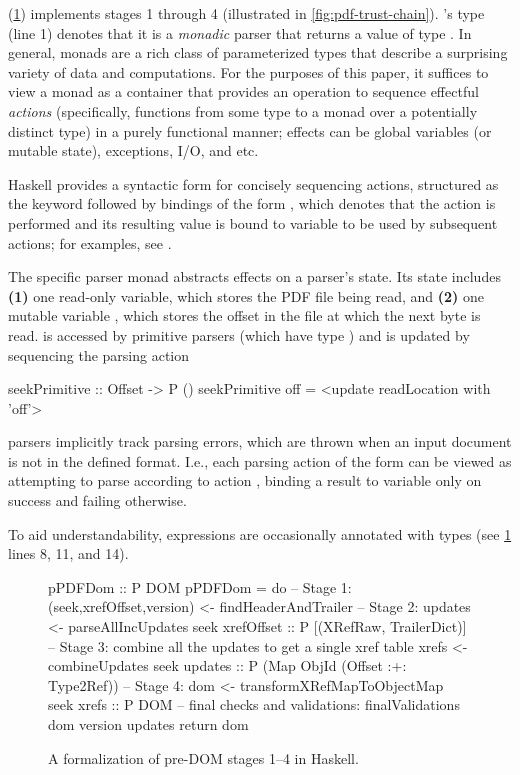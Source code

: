  (\cref{fig:spec}) implements stages 1 through 4 (illustrated in \cref{fig:pdf-trust-chain}).
% 
's type (line 1) denotes that it
is a \emph{monadic} parser  that returns a value of type
.
%
In general, monads are a rich class of parameterized types that
describe a surprising variety of data and computations.
%
For the purposes of this paper, it suffices to view a monad as a container that provides an operation 
to sequence effectful \emph{actions} (specifically, functions from some type to a monad over a 
potentially distinct type) in a purely functional manner;
%
effects can be global variables (or mutable state), exceptions, I/O, and etc.

Haskell provides a syntactic form for concisely sequencing actions, structured as 
the keyword  followed by bindings of the form , which denotes 
that the action  is performed and its resulting value is bound to variable  to be used by subsequent actions;
%
for examples, see .

The specific parser monad  abstracts effects on a parser's state.
%
Its state includes %
\textbf{(1)} one read-only variable, which stores the PDF file being read, and %
\textbf{(2)} one mutable variable \rdloc{}, which stores the offset in the file at which the next byte is read.
%
\rdloc{} is accessed by primitive parsers (which have type )
and is updated by sequencing the parsing action
\begin{codeNoExecute}
  seekPrimitive :: Offset -> P ()
  seekPrimitive off = <update readLocation with 'off'>
\end{codeNoExecute}
%
 parsers implicitly track parsing errors, which are thrown when an input document is not in the defined format.
%
I.e., each parsing action of the form  can be viewed as attempting to parse according to action , binding a result to variable  only on success and failing otherwise.

To aid understandability, expressions are occasionally annotated with types (see \cref{fig:spec} lines 8, 11, and 14).

\begin{figure}[t]
\centering
\lstset{numbers=right}
\begin{code}
pPDFDom :: P DOM
pPDFDom =
    do
    -- Stage 1:
    (seek,xrefOffset,version) <- findHeaderAndTrailer
    -- Stage 2:
    updates <- parseAllIncUpdates seek xrefOffset
               :: P [(XRefRaw, TrailerDict)]
    -- Stage 3: combine all the updates to get a single xref table
    xrefs <- combineUpdates seek updates
             :: P (Map ObjId (Offset :+: Type2Ref))
    -- Stage 4:
    dom <- transformXRefMapToObjectMap seek xrefs
           :: P DOM
    -- final checks and validations:
    finalValidations dom version updates
    return dom
\end{code}
\caption{A formalization of pre-DOM stages 1--4 in Haskell.}
\label{fig:spec}
\end{figure}


